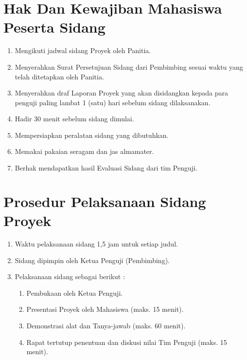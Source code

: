 \section{Hak	Dan	Kewajiban	Mahasiswa	Peserta	Sidang}
\begin{enumerate}
\item Mengikuti	jadwal	sidang	Proyek	oleh	Panitia.
\item Menyerahkan	 Surat	 Persetujuan	 Sidang	 dari	 Pembimbing	 sesuai	 waktu	 yang	 telah	
ditetapkan	oleh	Panitia.
\item Menyerahkan	 draf	 Laporan	 Proyek	 yang	 akan	 disidangkan	 kepada	 para	 penguji	 paling	
lambat	1	(satu)	hari	sebelum	sidang	dilaksanakan.
\item Hadir	30	menit	sebelum	sidang	dimulai.
\item Mempersiapkan	peralatan	sidang	yang	dibutuhkan.
\item Memakai	pakaian	seragam	dan	jas	almamater.
\item Berhak	mendapatkan	hasil	Evaluasi	Sidang	dari	tim	Penguji.
\end{enumerate}

\section{Prosedur Pelaksanaan	Sidang	Proyek	}
\begin{enumerate}
\item Waktu	pelaksanaan	sidang	1,5	jam	untuk	setiap	judul.
\item Sidang	dipimpin	oleh	Ketua	Penguji	(Pembimbing).
\item Pelaksanaan	sidang	sebagai	berikut :
	\begin{enumerate} [label=(\alph*)]
		\item Pembukaan	oleh	Ketua	Penguji. 
		\item Presentasi	Proyek	oleh	Mahasiswa		(maks.	15	menit).
		\item Demonstrasi	alat	dan	Tanya-jawab	(maks.	60	menit).
		\item Rapat	tertutup	penentuan	dan	diskusi	nilai	Tim	Penguji	(maks.	15	menit).
	\end{enumerate}
\end{enumerate}

